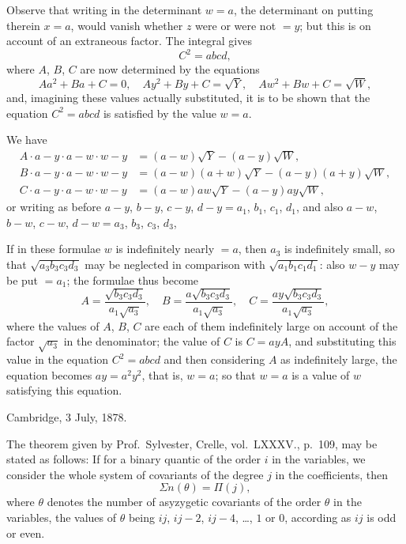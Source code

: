 \documentclass[11pt,a4paper]{book}
\begin{document}
\clearpage
Observe that writing in the determinant $w = a$, the determinant on putting therein $x = a$, would vanish whether $z$ were or were not $= y$; but this is on account of an extraneous factor. The integral gives
\[
C^2 = abcd,
\]
where $A$, $B$, $C$ are now determined by the equations
\[
Aa^2 + Ba + C = 0, \quad Ay^2 + By + C = \sqrt{Y}, \quad Aw^2 + Bw + C = \sqrt{W},
\]
and, imagining these values actually substituted, it is to be shown that the equation $C^2 = abcd$ is satisfied by the value $w = a$.

We have
\begin{align*}
A \cdot a - y \cdot a - w \cdot w - y &= (a - w)\sqrt{Y} - (a - y)\sqrt{W}, \\
B \cdot a - y \cdot a - w \cdot w - y &= (a - w)(a + w)\sqrt{Y} - (a - y)(a + y)\sqrt{W}, \\
C \cdot a - y \cdot a - w \cdot w - y &= (a - w)aw\sqrt{Y} - (a - y)ay\sqrt{W},
\end{align*}
or writing as before $a - y$, $b - y$, $c - y$, $d - y = a_1$, $b_1$, $c_1$, $d_1$, and also $a - w$, $b - w$, $c - w$, $d - w = a_3$, $b_3$, $c_3$, $d_3$,

\clearpage
If in these formulae $w$ is indefinitely nearly $= a$, then $a_3$ is indefinitely small, so that $\sqrt{a_3b_3c_3d_3}$ may be neglected in comparison with $\sqrt{a_1b_1c_1d_1}$: also $w - y$ may be put $= a_1$; the formulae thus become
\[
A = \frac{\sqrt{b_3c_3d_3}}{a_1\sqrt{a_3}}, \quad B = \frac{a\sqrt{b_3c_3d_3}}{a_1\sqrt{a_3}}, \quad C = \frac{ay\sqrt{b_3c_3d_3}}{a_1\sqrt{a_3}},
\]
where the values of $A$, $B$, $C$ are each of them indefinitely large on account of the factor $\sqrt{a_3}$ in the denominator; the value of $C$ is $C = ayA$, and substituting this value in the equation $C^2 = abcd$ and then considering $A$ as indefinitely large, the equation becomes $ay = a^2y^2$, that is, $w = a$; so that $w = a$ is a value of $w$ satisfying this equation.

Cambridge, 3 July, 1878.

\clearpage

The theorem given by Prof.\ Sylvester, Crelle, vol.\ LXXXV., p.\ 109, may be stated as follows: If for a binary quantic of the order $i$ in the variables, we consider the whole system of covariants of the degree $j$ in the coefficients, then
\[
\Sigma n(\theta) = \Pi(j),
\]
where $\theta$ denotes the number of asyzygetic covariants of the order $\theta$ in the variables, the values of $\theta$ being $ij$, $ij - 2$, $ij - 4$, \dots, $1$ or $0$, according as $ij$ is odd or even.
\end{document}

